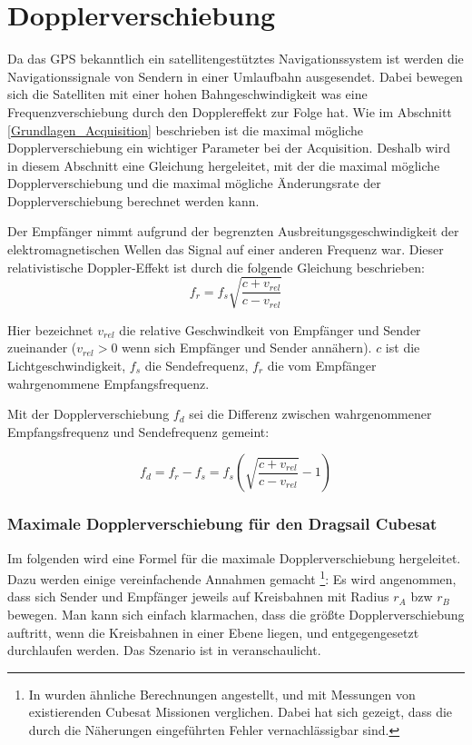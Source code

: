 \section{Dopplerverschiebung}
Da das GPS bekanntlich ein satellitengestütztes Navigationssystem ist werden die Navigationssignale von Sendern in einer Umlaufbahn ausgesendet. Dabei bewegen sich die Satelliten mit einer hohen Bahngeschwindigkeit was eine Frequenzverschiebung durch den Dopplereffekt zur Folge hat. Wie im Abschnitt \ref{Grundlagen_Acquisition} beschrieben ist die maximal mögliche Dopplerverschiebung ein wichtiger Parameter bei der Acquisition. Deshalb wird in diesem Abschnitt eine Gleichung hergeleitet, mit der die maximal mögliche Dopplerverschiebung und die maximal mögliche Änderungsrate der Dopplerverschiebung berechnet werden kann.

Der Empfänger nimmt aufgrund der begrenzten Ausbreitungsgeschwindigkeit der elektromagnetischen Wellen das Signal auf einer anderen Frequenz war. Dieser relativistische Doppler-Effekt ist durch die folgende Gleichung beschrieben:
\begin{equation}
    f_r=f_s \sqrt{\frac{c+v_{rel}}{c-v_{rel}}}
\end{equation}

Hier bezeichnet $v_{rel}$ die relative Geschwindkeit von Empfänger und Sender zueinander ($v_{rel}>0$ wenn sich Empfänger und Sender annähern). $c$ ist die Lichtgeschwindigkeit, $f_s$ die Sendefrequenz, $f_r$ die vom Empfänger wahrgenommene Empfangsfrequenz.

Mit der Dopplerverschiebung $f_d$ sei die Differenz zwischen wahrgenommener Empfangsfrequenz und Sendefrequenz gemeint:

\begin{equation}
\label{EqDoppler}
    f_d=f_r-f_s=f_s \left( \sqrt{\frac{c+v_{rel}}{c-v_{rel}}}-1 \right)
\end{equation}

\subsubsection{Maximale Dopplerverschiebung für den Dragsail Cubesat}
Im folgenden wird eine Formel für die  maximale Dopplerverschiebung hergeleitet. 
Dazu werden einige vereinfachende Annahmen gemacht \footnote{In \cite{Birklykke2010} wurden ähnliche Berechnungen angestellt, und mit Messungen von existierenden Cubesat Missionen verglichen. Dabei hat sich gezeigt, dass die durch die Näherungen eingeführten Fehler vernachlässigbar sind.}: Es wird angenommen, dass sich Sender und Empfänger jeweils auf Kreisbahnen mit Radius $r_A$ bzw $r_B$ bewegen. Man kann sich einfach klarmachen, dass die größte Dopplerverschiebung auftritt, wenn die Kreisbahnen in einer Ebene liegen, und entgegengesetzt durchlaufen werden. Das Szenario ist in  veranschaulicht.

